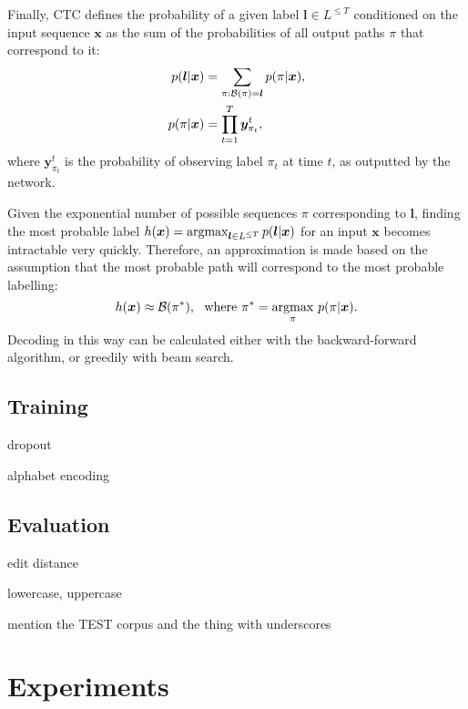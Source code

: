 	 		Finally, CTC defines the probability of a given label \(\bm{l} \in L^{\leq T}\) conditioned on the input sequence \(\mathbf{x}\) as the sum of the probabilities of all output paths \(\pi\) that correspond to it:
	 		\begin{align*}
				p(\bm{l} | \bm{x}) &= \sum_{\pi:{\cal B}(\pi)=\bm{l}}p(\pi|\bm{x}), \\
				p(\pi | \bm{x}) &= \prod_{t=1}^T \bm{y}_{\pi_t}^{t},
				\label{eq:stringprob}
			\end{align*}
			where \(\bm{y}_{\pi_t}^{t}\) is the probability of observing label \(\pi_t\) at time \(t\), as outputted by the network.

			Given the exponential number of possible sequences \(\pi\) corresponding to \(\bm l\), finding the most probable label \(h(\bm{x}) = \operatorname{argmax}_{\bm{l} \in L^{\leq T}} p(\bm{l} | \bm{x})\) for an input \(\bm x\) becomes intractable very quickly. Therefore, an approximation is made based on the assumption that the most probable path will correspond to the most probable labelling:\[
				h(\bm{x}) \approx \mathcal{B}(\pi^*),~~ \text{where } \pi^* = \underset{\pi}{\operatorname{argmax}}~ p(\pi|\bm{x}).
			\] Decoding in this way can be calculated either with the backward-forward algorithm, or greedily with beam search.




	\subsection{Training}
		dropout

		alphabet encoding



	\subsection{Evaluation}
		edit distance

		lowercase, uppercase

		mention the TEST corpus and the thing with underscores


\section{Experiments}\label{sec:transcription_experiments}

